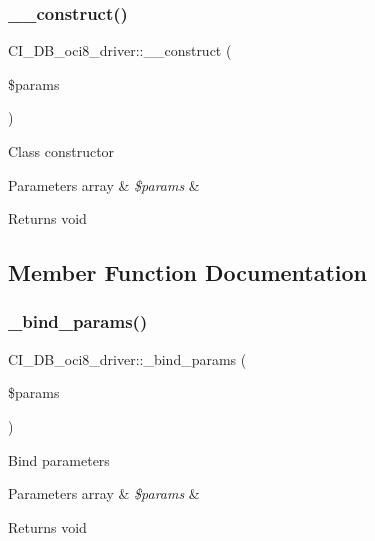 \subsubsection{\texorpdfstring{\+\_\+\+\_\+construct()}{\_\_construct()}}
{\footnotesize\ttfamily C\+I\+\_\+\+D\+B\+\_\+oci8\+\_\+driver\+::\+\_\+\+\_\+construct (\begin{DoxyParamCaption}\item[{}]{\$params }\end{DoxyParamCaption})}

Class constructor


\begin{DoxyParams}[1]{Parameters}
array & {\em \$params} & \\
\hline
\end{DoxyParams}
\begin{DoxyReturn}{Returns}
void 
\end{DoxyReturn}


\subsection{Member Function Documentation}
\mbox{\label{class_c_i___d_b__oci8__driver_adace0321549203c81958522ab1d88828}} 
\subsubsection{\texorpdfstring{\+\_\+bind\+\_\+params()}{\_bind\_params()}}
{\footnotesize\ttfamily C\+I\+\_\+\+D\+B\+\_\+oci8\+\_\+driver\+::\+\_\+bind\+\_\+params (\begin{DoxyParamCaption}\item[{}]{\$params }\end{DoxyParamCaption})\hspace{0.3cm}{\ttfamily [protected]}}

Bind parameters


\begin{DoxyParams}[1]{Parameters}
array & {\em \$params} & \\
\hline
\end{DoxyParams}
\begin{DoxyReturn}{Returns}
void 
\end{DoxyReturn}
\mbox{\label{class_c_i___d_b__oci8__driver_adeb12409f05b79a4634151ec07eb61cf}} 
